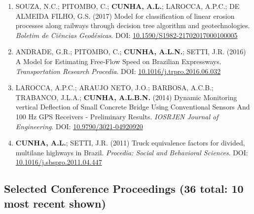 \documentclass[
  10pt,
  a4paper,
  DIV=11,
  numbers=noendperiod]{scrartcl}
\begin{document}
\begin{enumerate}
{  Society}. DOI:
  \href{https://doi.org/10.1016/j.tbs.2016.08.003}{10.1016/j.tbs.2016.08.003}
\item
  SOUZA, N.C.; PITOMBO, C.; \textbf{CUNHA, A.L.}; LAROCCA, A.P.C.; DE
  ALMEIDA FILHO, G.S. (2017) Model for classification of linear erosion
  processes along railways through decision tree algorithm and
  geotechnologies. \emph{Boletim de Ciências Geodésicas}. DOI:
  \href{https://doi.org/10.1590/S1982-21702017000100005}{10.1590/S1982-21702017000100005}
\item
  ANDRADE, G.R.; PITOMBO, C.; \textbf{CUNHA, A.L.N.}; SETTI, J.R. (2016)
  A Model for Estimating Free-Flow Speed on Brazilian Expressways.
  \emph{Transportation Research Procedia}. DOI:
  \href{https://doi.org/10.1016/j.trpro.2016.06.032}{10.1016/j.trpro.2016.06.032}
\item
  LAROCCA, A.P.C.; ARAUJO NETO, J.O.; BARBOSA, A.C.B.; TRABANCO, J.L.A.;
  \textbf{CUNHA, A.L.B.N.} (2014) Dynamic Monitoring vertical Deflection
  of Small Concrete Bridge Using Conventional Sensors And 100 Hz GPS
  Receivers - Preliminary Results. \emph{IOSRJEN Journal of
  Engineering}. DOI:
  \href{https://doi.org/10.9790/3021-04920920}{10.9790/3021-04920920}
\item
  \textbf{CUNHA, A.L.}; SETTI, J.R. (2011) Truck equivalence factors for
  divided, multilane highways in Brazil. \emph{Procedia: Social and
  Behavioral Sciences}. DOI:
  \href{https://doi.org/10.1016/j.sbspro.2011.04.447}{10.1016/j.sbspro.2011.04.447}
\end{enumerate}

\subsection{Selected Conference Proceedings (36 total: 10 most recent
shown)}\label{selected-conference-proceedings-36-total-10-most-recent-shown}
\end{document}
